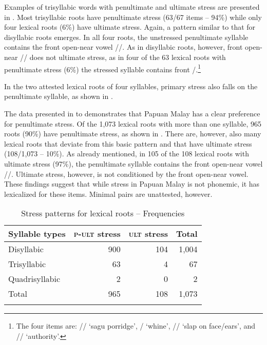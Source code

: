 Examples of trisyllabic words with penultimate and ultimate stress are presented in . Most trisyllabic roots have penultimate stress (63/67 items – 94\%) while only four lexical roots (6\%) have ultimate stress. Again, a pattern similar to that for disyllabic roots emerges. In all four roots, the unstressed penultimate syllable contains the front open-near vowel //. As in disyllabic roots, however, front open-near // does not  ultimate stress, as in four of the 63 lexical roots with penultimate stress (6\%) the stressed syllable contains front /.\footnote{The four items are:  // ‘sagu porridge’,  / ‘whine’,  // ‘slap on face/ears’, and  // ‘authority’.}


In the two attested lexical roots of four syllables, primary stress also falls on the penultimate syllable, as shown in  .


The data presented in  to  demonstrates that Papuan Malay has a clear preference for penultimate stress. Of the 1,073 lexical roots with more than one syllable, 965 roots (90\%) have penultimate stress, as shown in . There are, however, also many lexical roots that deviate from this basic pattern and that have ultimate stress (108/1,073 – 10\%). As already mentioned, in 105 of the 108 lexical roots with ultimate stress (97\%), the penultimate syllable contains the front open-near vowel //. Ultimate stress, however, is not conditioned by the front open-near vowel. These findings suggest that while stress in Papuan Malay is not phonemic, it has lexicalized for these items. Minimal pairs are unattested, however.

\begin{table}
\caption{Stress patterns for lexical roots – Frequencies\label{Table_2.41}}
\begin{tabular}{lrrr}
\lsptoprule
 Syllable types & \textsc{p-ult} stress & \textsc{ult} stress &  Total\\


\midrule

Disyllabic &  900 &  104 &  1,004\\

Trisyllabic &  63 &  4 &  67\\

Quadrisyllabic &  2 &  0 &  2\\
\midrule
Total &  965 &  108 &  1,073\\

\lspbottomrule

\end{tabular}
\end{table}
